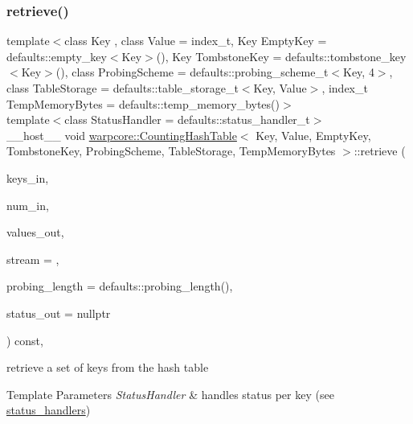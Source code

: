 \subsubsection{\texorpdfstring{retrieve()}{retrieve()}\hspace{0.1cm}{\footnotesize\ttfamily [2/2]}}
{\footnotesize\ttfamily template$<$class Key , class Value  = index\+\_\+t, Key Empty\+Key = defaults\+::empty\+\_\+key$<$\+Key$>$(), Key Tombstone\+Key = defaults\+::tombstone\+\_\+key$<$\+Key$>$(), class Probing\+Scheme  = defaults\+::probing\+\_\+scheme\+\_\+t$<$\+Key, 4$>$, class Table\+Storage  = defaults\+::table\+\_\+storage\+\_\+t$<$\+Key, Value$>$, index\+\_\+t Temp\+Memory\+Bytes = defaults\+::temp\+\_\+memory\+\_\+bytes()$>$ \\
template$<$class Status\+Handler  = defaults\+::status\+\_\+handler\+\_\+t$>$ \\
\+\_\+\+\_\+host\+\_\+\+\_\+ void \hyperlink{classwarpcore_1_1CountingHashTable}{warpcore\+::\+Counting\+Hash\+Table}$<$ Key, Value, Empty\+Key, Tombstone\+Key, Probing\+Scheme, Table\+Storage, Temp\+Memory\+Bytes $>$\+::retrieve (\begin{DoxyParamCaption}\item[{key\+\_\+type $\ast$}]{keys\+\_\+in,  }\item[{index\+\_\+type}]{num\+\_\+in,  }\item[{value\+\_\+type $\ast$}]{values\+\_\+out,  }\item[{cuda\+Stream\+\_\+t}]{stream = {},  }\item[{index\+\_\+type}]{probing\+\_\+length = {\ttfamily defaults\+:\+:probing\+\_\+length()},  }\item[{typename Status\+Handler\+::base\+\_\+type $\ast$}]{status\+\_\+out = {\ttfamily nullptr} }\end{DoxyParamCaption}) const\hspace{0.3cm}{\ttfamily [inline]}, {\ttfamily [noexcept]}}



retrieve a set of keys from the hash table 


\begin{DoxyTemplParams}{Template Parameters}
{\em Status\+Handler} & handles status per key (see {\ttfamily \hyperlink{namespacewarpcore_1_1status__handlers}{status\+\_\+handlers}}) \\
\hline
\end{DoxyTemplParams}

